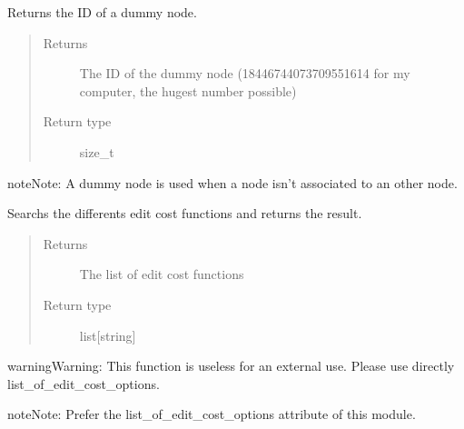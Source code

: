 \documentclass[letterpaper,10pt,english]{sphinxmanual}
\begin{document}
\begin{fulllineitems}
\label{doc:gedlibpy.get_dummy_node}
Returns the ID of a dummy node.
\begin{quote}\begin{description}
\item[{Returns}] \leavevmode
The ID of the dummy node (18446744073709551614 for my computer, the hugest number possible)

\item[{Return type}] \leavevmode
size\_t

\end{description}\end{quote}

\begin{notice}{note}{Note:}
A dummy node is used when a node isn't associated to an other node.
\end{notice}

\end{fulllineitems}


\begin{fulllineitems}
\label{doc:gedlibpy.get_edit_cost_options}
Searchs the differents edit cost functions and returns the result.
\begin{quote}\begin{description}
\item[{Returns}] \leavevmode
The list of edit cost functions

\item[{Return type}] \leavevmode
list{[}string{]}

\end{description}\end{quote}

\begin{notice}{warning}{Warning:}
This function is useless for an external use. Please use directly list\_of\_edit\_cost\_options.
\end{notice}

\begin{notice}{note}{Note:}
Prefer the list\_of\_edit\_cost\_options attribute of this module.
\end{notice}

\end{fulllineitems}
\end{document}

